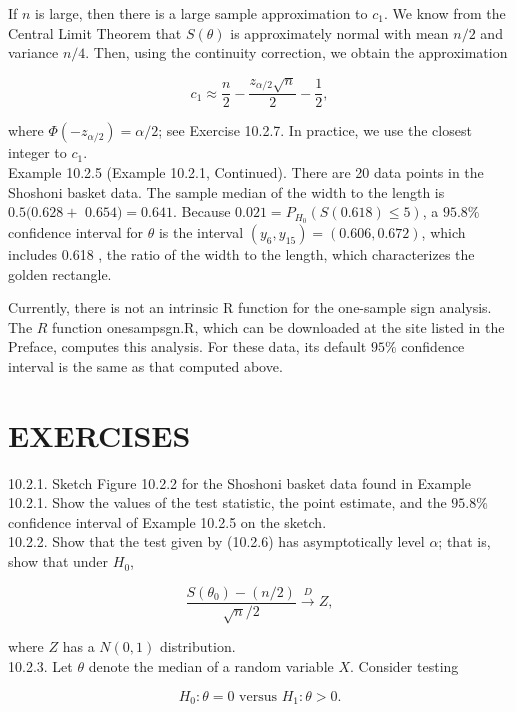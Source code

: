 If $n$ is large, then there is a large sample approximation to $c_{1}$. We know from the Central Limit Theorem that $S(\theta)$ is approximately normal with mean $n / 2$ and variance $n / 4$. Then, using the continuity correction, we obtain the approximation


\begin{equation*}
c_{1} \approx \frac{n}{2}-\frac{z_{\alpha / 2} \sqrt{n}}{2}-\frac{1}{2}, \tag{10.2.37}
\end{equation*}


where $\Phi\left(-z_{\alpha / 2}\right)=\alpha / 2$; see Exercise 10.2.7. In practice, we use the closest integer to $c_{1}$.\\
Example 10.2.5 (Example 10.2.1, Continued). There are 20 data points in the Shoshoni basket data. The sample median of the width to the length is $0.5(0.628+$ $0.654)=0.641$. Because $0.021=P_{H_{0}}(S(0.618) \leq 5)$, a $95.8 \%$ confidence interval for $\theta$ is the interval $\left(y_{6}, y_{15}\right)=(0.606,0.672)$, which includes 0.618 , the ratio of the width to the length, which characterizes the golden rectangle.

Currently, there is not an intrinsic R function for the one-sample sign analysis. The $R$ function onesampsgn.R, which can be downloaded at the site listed in the Preface, computes this analysis. For these data, its default $95 \%$ confidence interval is the same as that computed above.

\section*{EXERCISES}
10.2.1. Sketch Figure 10.2.2 for the Shoshoni basket data found in Example 10.2.1. Show the values of the test statistic, the point estimate, and the $95.8 \%$ confidence interval of Example 10.2.5 on the sketch.\\
10.2.2. Show that the test given by (10.2.6) has asymptotically level $\alpha$; that is, show that under $H_{0}$,

$$
\frac{S\left(\theta_{0}\right)-(n / 2)}{\sqrt{n} / 2} \stackrel{D}{\rightarrow} Z,
$$

where $Z$ has a $N(0,1)$ distribution.\\
10.2.3. Let $\theta$ denote the median of a random variable $X$. Consider testing

$$
H_{0}: \theta=0 \text { versus } H_{1}: \theta>0 .
$$

